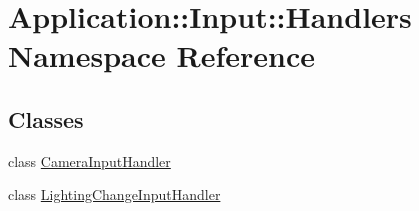 \hypertarget{namespaceApplication_1_1Input_1_1Handlers}{}\section{Application\+:\+:Input\+:\+:Handlers Namespace Reference}
\label{namespaceApplication_1_1Input_1_1Handlers}
\subsection*{Classes}
\begin{DoxyCompactItemize}
\item 
class \mbox{\hyperlink{classApplication_1_1Input_1_1Handlers_1_1CameraInputHandler}{Camera\+Input\+Handler}}
\item 
class \mbox{\hyperlink{classApplication_1_1Input_1_1Handlers_1_1LightingChangeInputHandler}{Lighting\+Change\+Input\+Handler}}
\end{DoxyCompactItemize}
